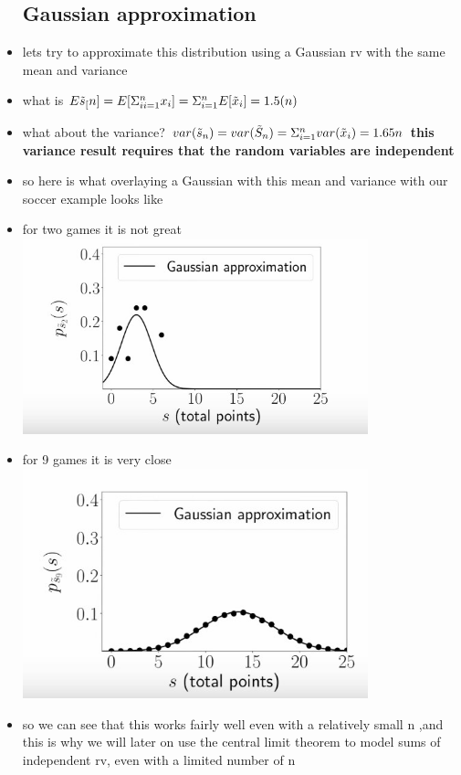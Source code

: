 \documentclass{article}
\begin{document}
\begin{itemize}
\subsection{Gaussian approximation }
\item lets try to approximate this distribution using a Gaussian rv with the same mean and variance 
\item what is $E{\Tilde{s}_[n]}=E[\Sigma_{ii=1}^{n}x_i]=\Sigma_{i=1}^{n}E[\Tilde{x}_i]=1.5(n)$
\item what about the variance? $var(\Tilde{s}_{n})=var(\Tilde{S}_{n})=\Sigma_{i=1}^{n}var(\Tilde{x}_i)=1.65n$ \textbf{this variance result requires that the random variables are independent} 
\item so here is what overlaying a Gaussian with this mean and variance with our soccer example looks like 
\item for two games it is not great \\\includegraphics[width=10cm]{notes/week_4/vidio 1: Why Sums And Averages Tend To Look Gaussian/immages/v1_3.jpg}
\item for 9 games it is very close \\\includegraphics[width=10cm]{notes/week_4/vidio 1: Why Sums And Averages Tend To Look Gaussian/immages/v1_4.jpg}
\item so we can see that this works fairly well even with a relatively small n ,and this is why we will later on use the central limit theorem to model sums of independent rv, even with a limited number of n 

\end{itemize}
\end{document}
